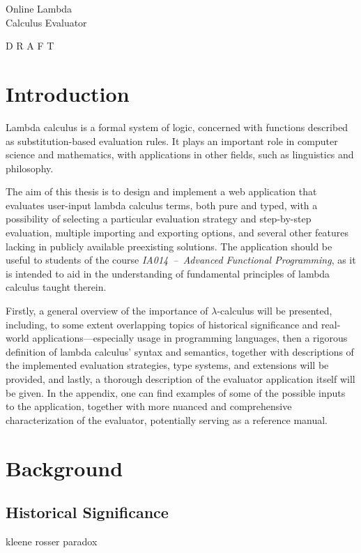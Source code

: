 \documentclass[a4paper,10pt]{article}
\begin{document}
\vspace*{7cm}
\begin{center}
{\Huge 
Online Lambda\\Calculus Evaluator
}

D R A F T
\end{center}

\newpage
\tableofcontents
\newpage

\section{Introduction}
Lambda calculus is a formal system of logic, concerned with functions described as
substitution-based evaluation rules. It plays an important role in computer science
and mathematics, with applications in other fields, such as linguistics 
and philosophy.

The aim of this thesis is to design and implement a web application that evaluates
user-input lambda calculus terms, both pure and typed, with a possibility of
selecting a particular evaluation strategy and step-by-step evaluation, 
multiple importing and exporting options, and several other features lacking 
in publicly available preexisting solutions. The application should be useful to students of
the course \textit{IA014~--~Advanced Functional Programming}, as it is intended to aid in the understanding
of fundamental principles of lambda calculus taught therein.

Firstly, a general overview of the importance of $\lambda$-calculus will be presented,
including, to some extent overlapping topics of historical significance 
and real-world applications---especially usage in
programming languages, then a rigorous definition of lambda calculus' syntax and semantics, together with
descriptions of the implemented evaluation strategies, type systems, and extensions will be provided,
and lastly, a thorough description of the evaluator application itself will be given. In the appendix,
one can find examples of some of the possible inputs to the application, together with more
nuanced and comprehensive characterization of the evaluator, potentially serving as a reference manual.
\newpage

\section{Background}
\subsection{Historical Significance}
kleene rosser paradox
\end{document}
